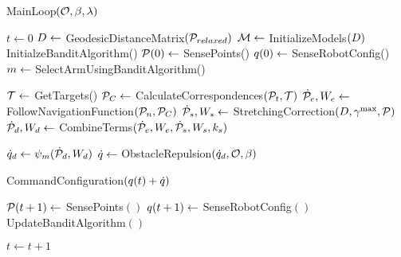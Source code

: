 \begin{algorithm}[ht]
    \caption{MainLoop$(\mathcal{O}, \beta, \lambda)$}
    \begin{algorithmic}[1]
        \State $t \gets 0$
        \State $D \gets$ GeodesicDistanceMatrix$(\mathcal{P}_{relaxed})$
        \State $\mathcal{M} \gets$ InitializeModels$(D)$
        \State InitialzeBanditAlgorithm()
        \State $\mathcal{P}(0) \gets$ SensePoints()
        \State $q(0) \gets$ SenseRobotConfig()
            \State $m \gets $ SelectArmUsingBanditAlgorithm()
            
            \State $\mathcal{T} \gets$ GetTargets()
            \State $\mathcal{P}_C \gets$ CalculateCorrespondences$(\mathcal{P}_t, \mathcal{T})$
            \State $\dot{\mathcal{P}}_e, W_e \gets$ FollowNavigationFunction$(\mathcal{P}_n, \mathcal{P}_C)$
            \State $\dot{\mathcal{P}}_s, W_s \gets$ StretchingCorrection$(D, \gamma^{\textrm{max}}, \mathcal{P})$
            \State $\dot{\mathcal{P}}_d, W_d \gets$ CombineTerms$(\dot{\mathcal{P}}_e, W_e, \dot{\mathcal{P}}_s, W_s, k_s)$

            \State $\dot{q}_d \gets \psi_m(\dot{\mathcal{P}}_d, W_d)$
            \State $\dot{q} \gets$ ObstacleRepulsion$(\dot{q}_d, \mathcal{O}, \beta)$
            
            \State CommandConfiguration$(q(t) + \dot{q})$

            \State $\mathcal{P}(t + 1) \gets$ SensePoints$()$
            \State $q(t + 1) \gets$ SenseRobotConfig$()$
            \State UpdateBanditAlgorithm$()$
            
            \State $t \gets t + 1$
        \EndWhile
    \end{algorithmic}
    \label{alg:mab_mainloop}
\end{algorithm}

